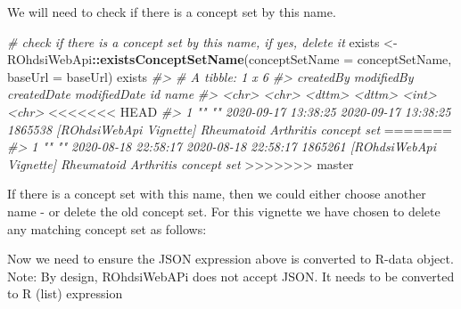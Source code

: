 \documentclass[
]{article}
\newenvironment{Shaded}{\begin{snugshade}}{\end{snugshade}}
\newcommand{\CommentTok}[1]{\textcolor[rgb]{0.56,0.35,0.01}{\textit{#1}}}
\newcommand{\ControlFlowTok}[1]{\textcolor[rgb]{0.13,0.29,0.53}{\textbf{#1}}}
\newcommand{\DataTypeTok}[1]{\textcolor[rgb]{0.13,0.29,0.53}{#1}}
\newcommand{\KeywordTok}[1]{\textcolor[rgb]{0.13,0.29,0.53}{\textbf{#1}}}
\newcommand{\NormalTok}[1]{#1}
\newcommand{\OperatorTok}[1]{\textcolor[rgb]{0.81,0.36,0.00}{\textbf{#1}}}
\newcommand{\StringTok}[1]{\textcolor[rgb]{0.31,0.60,0.02}{#1}}
\begin{document}
We will need to check if there is a concept set by this name.

\begin{Shaded}
\begin{Highlighting}[]
\CommentTok{# check if there is a concept set by this name, if yes, delete it}
\NormalTok{exists <-}\StringTok{ }\NormalTok{ROhdsiWebApi}\OperatorTok{::}\KeywordTok{existsConceptSetName}\NormalTok{(}\DataTypeTok{conceptSetName =}\NormalTok{ conceptSetName, }\DataTypeTok{baseUrl =}\NormalTok{ baseUrl)}
\NormalTok{exists}
\CommentTok{#> # A tibble: 1 x 6}
\CommentTok{#>   createdBy modifiedBy createdDate         modifiedDate             id name                                                    }
\CommentTok{#>   <chr>     <chr>      <dttm>              <dttm>                <int> <chr>                                                   }
<<<<<<< HEAD
\CommentTok{#> 1 ""        ""         2020-09-17 13:38:25 2020-09-17 13:38:25 1865538 [ROhdsiWebApi Vignette] Rheumatoid Arthritis concept set}
=======
\CommentTok{#> 1 ""        ""         2020-08-18 22:58:17 2020-08-18 22:58:17 1865261 [ROhdsiWebApi Vignette] Rheumatoid Arthritis concept set}
>>>>>>> master
\end{Highlighting}
\end{Shaded}

If there is a concept set with this name, then we could either choose
another name - or delete the old concept set. For this vignette we have
chosen to delete any matching concept set as follows:

\begin{Shaded}
\end{Shaded}

Now we need to ensure the JSON expression above is converted to R-data
object. Note: By design, ROhdsiWebAPi does not accept JSON. It needs to
be converted to R (list) expression
\end{document}
